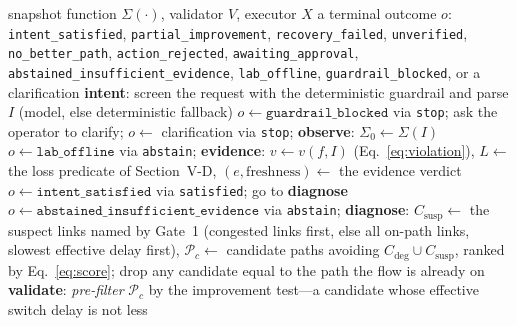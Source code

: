 \documentclass[conference]{IEEEtran}
\begin{document}
\begin{algorithm}[t]
\small
\caption{The guarded recovery workflow. The node names are those of the
compiled graph, and the routing is the routing function of the
implementation, not a paraphrase of it. Every branch terminates in exactly
one terminal node; the API persists the run record from the terminal state.}
\label{alg:agent}
\begin{algorithmic}[1]
\Require snapshot function $\Sigma(\cdot)$, validator $V$, executor $X$
\Ensure a terminal outcome $o$: \texttt{intent\_satisfied},
  \texttt{partial\_improvement}, \texttt{recovery\_failed},
  \texttt{unverified}, \texttt{no\_better\_path}, \texttt{action\_rejected},
  \texttt{awaiting\_approval}, \texttt{abstained\_insufficient\_evidence},
  \texttt{lab\_offline}, \texttt{guardrail\_blocked}, or a clarification
\State \textbf{intent}: screen the request with the deterministic guardrail
  and parse $I$ (model, else deterministic fallback)
  \State $o\gets\texttt{guardrail\_blocked}$ via \texttt{stop}; \Return
\EndIf
{}
  \State ask the operator to clarify; $o\gets$ clarification via
    \texttt{stop}; \Return
\EndIf
\State \textbf{observe}: $\Sigma_0\gets\Sigma(I)$
  \State $o\gets\texttt{lab\_offline}$ via \texttt{abstain}; \Return
\EndIf
\State \textbf{evidence}: $v\gets v(f,I)$ (Eq.~\eqref{eq:violation}),
  $L\gets$ the loss predicate of Section~V-D, $(e,\text{freshness})\gets$
  the evidence verdict
  \State $o\gets\texttt{intent\_satisfied}$ via \texttt{satisfied}; \Return
  \State go to \textbf{diagnose}
\Else
  \State $o\gets\texttt{abstained\_insufficient\_evidence}$ via
    \texttt{abstain}; \Return {}
\EndIf
\State \textbf{diagnose}: $C_{\mathrm{susp}}\gets$ the suspect links named
  by Gate~1 (congested links first, else all on-path links, slowest
  effective delay first), $\mathcal{P}_c\gets$ candidate paths avoiding
  $C_{\mathrm{deg}}\cup C_{\mathrm{susp}}$, ranked by Eq.~\eqref{eq:score};
  drop any candidate equal to the path the flow is already on
\State \textbf{validate}: \emph{pre-filter} $\mathcal{P}_c$ by the
  improvement test---a candidate whose effective switch delay is not less

\end{algorithmic}
\end{algorithm}
\end{document}
